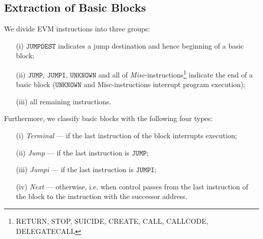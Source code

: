 \documentclass[sigplan,10pt]{acmart}\settopmatter{printfolios=true,printccs=false,printacmref=false}
\newcommand{\instr}[1]{\mathtt{#1}}
\begin{document}
\subsection{Extraction of Basic Blocks}
\label{sec:extract}
%
We divide EVM instructions into three groups:
\begin{itemize}
\item[(i)] $\instr{JUMPDEST}$ indicates a jump destination and hence beginning of a
                                 basic block;
\item[(ii)] $\instr{JUMP}$, $\instr{JUMPI}$, $\instr{UNKNOWN}$ and all of 
            \emph{Misc}-instructions\footnote{RETURN, STOP, SUICIDE, CREATE, CALL, CALLCODE, DELEGATECALL}
            indicate the end of a basic block ($\instr{UNKNOWN}$ and Misc-instructions interrupt program execution); 
\item[(iii)] all remaining instructions. %
\end{itemize}  
Furthermore, we classify basic blocks with the following four types:
\begin{itemize}
\item[(i)] \textit{Terminal} --- if the last instruction of the block interrupts execution;
\item[(ii)] \textit{Jump} --- if the last instruction is $\instr{JUMP}$;
\item[(iii)] \textit{Jumpi} --- if the last instruction is $\instr{JUMPI}$;
\item[(iv)] \textit{Next} --- otherwise, i.e. when control passes from the last instruction of the block
                             to the instruction with the successor address.                         
\end{itemize} 
\end{document}
